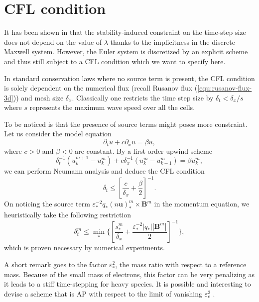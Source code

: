 \documentclass{report}
\begin{document}
\section{CFL condition}

It has been shown in \cite{degond_2012} that the stability-induced constraint on the time-step size does not depend on the value of $\lambda$ thanks to the implicitness in the discrete Maxwell system. However, the Euler system is discretized by an explicit scheme and thus still subject to a CFL condition which we want to specify here. 

In standard conservation laws where no source term is present, the CFL condition is solely dependent on the numerical flux (recall Rusanov flux (\ref{equ:rusanov-flux-3d})) and mesh size $\delta_x$. Classically one restricts the time step size by $\delta_t < \delta_x/s$ where $s$ represents the maximum wave speed over all the cells. 

To be noticed is that the presence of source terms might poses more constraint. Let us consider the model equation
\begin{equation*}
    \partial_tu + c\partial_xu = \beta u, 
\end{equation*}
where $c>0$ and $\beta<0$ are constant. By a first-order upwind scheme
\begin{equation*}
    \delta_t^{-1}(u^{m+1}_k - u^m_k) + c\delta_x^{-1}(u^m_k - u^m_{k-1}) = \beta u^m_k,
\end{equation*}
we can perform Neumann analysis and deduce the CFL condition
\begin{equation*}
    \delta_t \leq \left[\frac{c}{\delta_x} + \frac{\beta}{2}\right]^{-1}.
\end{equation*}
On noticing the source term $\varepsilon_*^{-2}q_*(n\mathbf{u})^m_*\times\mathbf{B}^m$ in the momentum equation, we heuristically take the following restriction
\begin{equation*}
    \delta_t^m \leq \min_*\bigg\{\left[\frac{s^m_*}{\delta_x} + \frac{\varepsilon^{-2}_*|q_*||\mathbf{B}^m|}{2}\right]^{-1}\bigg\},
\end{equation*}
which is proven necessary by numerical experiments.

A short remark goes to the factor $\varepsilon_*^{2}$, the mass ratio with respect to a reference mass. Because of the small mass of electrons, this factor can be very penalizing as it leads to a stiff time-stepping for heavy species. It is possible and interesting to devise a scheme that is AP with respect to the limit of vanishing $\varepsilon_e^{2}$ \citep{degond_2008}.
\end{document}

